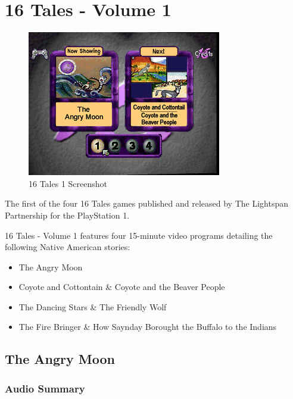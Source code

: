\chapter{16 Tales - Volume 1}

\begin{figure}[H]
    \centering
    \includegraphics[width=\textwidth/2]{"./Games/16Tales/Images/16Tales1Screenshot.png"}
    \caption{16 Tales 1 Screenshot}
\end{figure}

The first of the four 16 Tales games published and released by The Lightspan Partnership for the PlayStation 1.

16 Tales - Volume 1 features four 15-minute video programs detailing the following Native American stories:

\begin{itemize}
    \item The Angry Moon
    \item Coyote and Cottontain \& Coyote and the Beaver People
    \item The Dancing Stars \& The Friendly Wolf
    \item The Fire Bringer \& How Saynday Borought the Buffalo to the Indians
\end{itemize}

\clearpage
\newpage

\section{The Angry Moon}

\subsection{Audio Summary}

